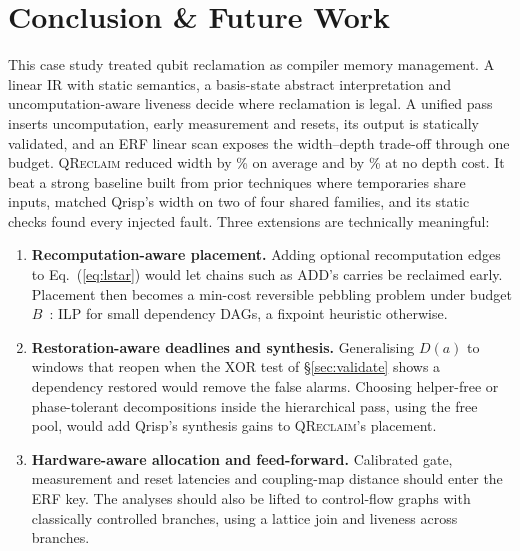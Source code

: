 \documentclass[conference,a4paper]{IEEEtran}
\newcommand{\QR}{\textup{\textsc{QReclaim}}}
\begin{document}
\section{Conclusion \& Future Work}
This case study treated qubit reclamation as compiler memory management. A linear IR with static semantics, a basis-state abstract interpretation and uncomputation-aware liveness decide where reclamation is legal. A unified pass inserts uncomputation, early measurement and resets, its output is statically validated, and an ERF linear scan exposes the width--depth trade-off through one budget. \QR{} reduced width by \RedQRvsNR\% on average and by \RedDNvsNR\% at no depth cost. It beat a strong baseline built from prior techniques where temporaries share inputs, matched Qrisp's width on two of four shared families, and its static checks found every injected fault. Three extensions are technically meaningful:
\begin{enumerate}
\item \textbf{Recomputation-aware placement.} Adding optional recomputation edges to Eq.~(\ref{eq:lstar}) would let chains such as ADD's carries be reclaimed early. Placement then becomes a min-cost reversible pebbling problem under budget $B$~\cite{reqomp}: ILP for small dependency DAGs, a fixpoint heuristic otherwise.
\item \textbf{Restoration-aware deadlines and synthesis.} Generalising $D(a)$ to windows that reopen when the XOR test of \S\ref{sec:validate} shows a dependency restored would remove the false alarms. Choosing helper-free or phase-tolerant decompositions inside the hierarchical pass, using the free pool, would add Qrisp's synthesis gains to \QR{}'s placement.
\item \textbf{Hardware-aware allocation and feed-forward.} Calibrated gate, measurement and reset latencies and coupling-map distance should enter the ERF key. The analyses should also be lifted to control-flow graphs with classically controlled branches, using a lattice join and liveness across branches.
\end{enumerate}

\balance


\end{document}
